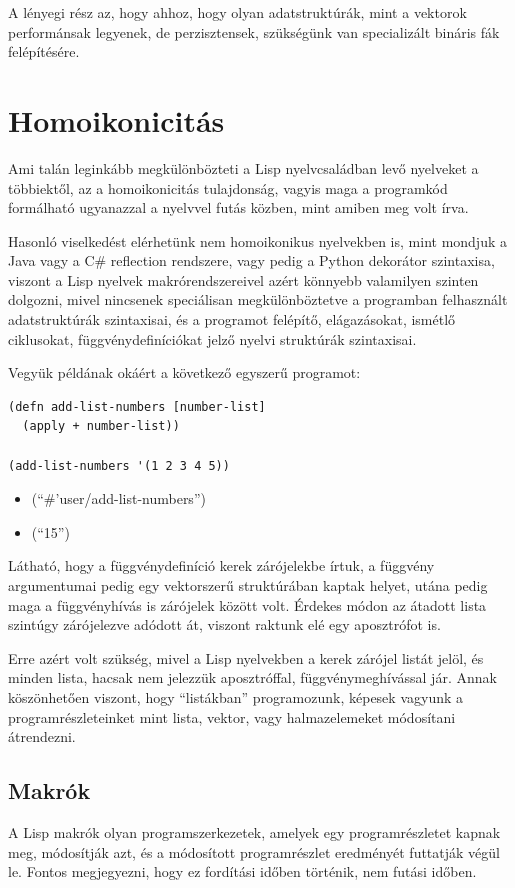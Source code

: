 \documentclass[final, 12pt] {ubb_dolgozat}
\begin{document}
A lényegi rész az, hogy ahhoz, hogy olyan adatstruktúrák, mint a vektorok performánsak legyenek, de perzisztensek, szükségünk van
specializált bináris fák felépítésére.

\section{Homoikonicitás}
\label{sec:orgc57cbe3}
Ami talán leginkább megkülönbözteti a Lisp nyelvcsaládban levő nyelveket a többiektől, az a  homoikonicitás \citep{mcilroyMacroInstructionExtensions1960} tulajdonság, vagyis maga a programkód
formálható ugyanazzal a nyelvvel futás közben, mint amiben meg volt írva.

Hasonló viselkedést elérhetünk nem homoikonikus nyelvekben is, mint mondjuk a Java vagy a C\# reflection rendszere, vagy
pedig a Python dekorátor szintaxisa, viszont a Lisp nyelvek makrórendszereivel azért könnyebb valamilyen szinten dolgozni, mivel nincsenek speciálisan megkülönböztetve a programban
felhasznált adatstruktúrák szintaxisai, és a programot felépítő, elágazásokat, ismétlő ciklusokat, függvénydefiníciókat jelző nyelvi struktúrák szintaxisai.

Vegyük példának okáért a következő egyszerű programot:

\begin{verbatim}
(defn add-list-numbers [number-list]
  (apply + number-list))

(add-list-numbers '(1 2 3 4 5))
\end{verbatim}

\begin{itemize}
\item (``\#'user/add-list-numbers'')
\item (``15'')
\end{itemize}

Látható, hogy a függvénydefiníció kerek zárójelekbe írtuk, a függvény argumentumai pedig egy vektorszerű struktúrában kaptak helyet, utána pedig maga a függvényhívás is zárójelek között volt. Érdekes módon az átadott lista szintúgy zárójelezve adódott át, viszont raktunk elé egy aposztrófot is.

Erre azért volt szükség, mivel a Lisp nyelvekben a kerek zárójel listát jelöl, és minden lista, hacsak nem jelezzük aposztróffal, függvénymeghívással jár. Annak köszönhetően viszont, hogy ``listákban'' programozunk, képesek vagyunk a programrészleteinket mint lista, vektor, vagy halmazelemeket
módosítani átrendezni.

\subsection{Makrók}
\label{sec:org3fb8753}
A Lisp makrók olyan programszerkezetek, amelyek egy programrészletet kapnak meg, módosítják azt, és a módosított programrészlet eredményét futtatják végül le. Fontos megjegyezni, hogy ez fordítási időben történik, nem futási időben.
\end{document}
